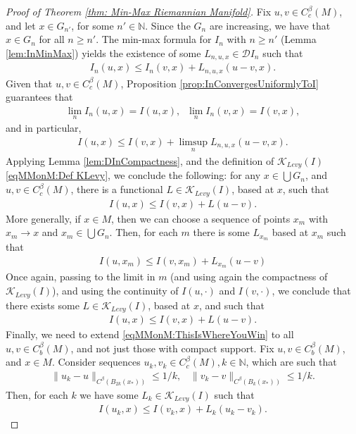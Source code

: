 \documentclass[11pt,reqno]{amsart}
\numberwithin{equation}{section}
\theoremstyle{plain}
\def\K{\mathcal K}
\begin{document}
\begin{proof}[Proof of Theorem \ref{thm: Min-Max Riemannian Manifold}]
Fix $u,v \in C^\beta_c(M)$, and let $x\in G_{n'}$, for some $n' \in \mathbb{N}$. Since the $G_n$ are increasing, we have that $x \in G_n$ for all $n\geq n'$. The min-max formula for $I_n$ with $n\geq n'$ (Lemma \ref{lem:InMinMax}) yields the existence of some $L_{n,u,x} \in \mathcal{D}I_n$ such that
\begin{align*}
  I_n(u,x) \leq I_n(v,x) + L_{n,u,x}(u-v,x).
\end{align*}
Given that $u,v \in C^\beta_c(M)$, Proposition \ref{prop:InConvergesUniformlyToI} guarantees that 
\begin{align*}
  \lim \limits_{n} I_n(u,x) = I(u,x),\;\;\lim \limits_n I_n(v,x) = I(v,x),
\end{align*}
and in particular,
\begin{align*}
  I(u,x) \leq I(v,x) + \limsup_{n} L_{n,u,x}(u-v,x).
\end{align*}
Applying Lemma \ref{lem:DInCompactness}, and the definition of $\K_{Levy}(I)$  \eqref{eqMMonM:Def KLevy}, we conclude the following: for any $x\in \bigcup G_n$, and $u,v\in C^\beta_c(M)$, there is a functional $L\in \K_{Levy}(I)$, based at $x$,  such that
\begin{align*}
  I(u,x) \leq I(v,x) + L(u-v).
\end{align*}
More generally, if $x\in M$, then we can choose a sequence of points $x_m$ with $x_m \to x$ and $x_m \in \bigcup G_n$. Then, for each $m$ there is some $L_{x_m}$ based at $x_m$ such that
\begin{align*}
  I(u,x_m) \leq I(v,x_m) +L_{x_m}(u-v)
\end{align*}
Once again, passing to the limit in $m$ (and using again the compactness of $\K_{Levy}(I)$), and using the continuity of $I(u,\cdot)$ and $I(v,\cdot)$, we conclude that there exists some $L\in \K_{Levy}(I)$, based at $x$, and such that
\begin{align*}
  I(u,x) \leq I(v,x) +L(u-v).
\end{align*}
Finally, we need to extend \eqref{eqMMonM:ThisIsWhereYouWin} to all $u,v\in C^\beta_b(M)$, and not just those with compact support. Fix $u,v \in C^\beta_b(M)$, and $x\in M$. Consider sequences $u_k,v_k \in C^\beta_c(M), k\in\mathbb{N}$, which are such that
\begin{align*}
  \|u_k-u\|_{C^\beta(B_{2k}(x_*))} \leq 1/k,\;\;\; \|v_k-v\|_{C^\beta(B_{k}(x_*))} \leq 1/k.  
\end{align*}
Then, for each $k$ we have some $L_k \in \K_{Levy}(I)$ such that
\begin{align*}
  I(u_k,x) \leq I(v_k,x) + L_{k}(u_k-v_k).

\end{align*}
\end{proof}
\end{document}
